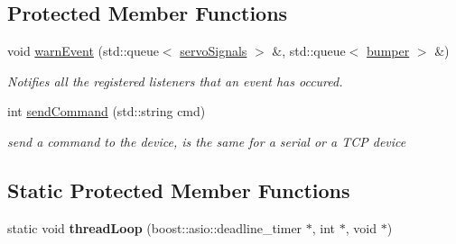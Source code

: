 \subsection*{Protected Member Functions}
\begin{DoxyCompactItemize}
\item 
\hypertarget{class_robot_a394e0a75b695970a8d67edb86d9c6b57}{}void \hyperlink{class_robot_a394e0a75b695970a8d67edb86d9c6b57}{warn\+Event} (std\+::queue$<$ \hyperlink{structservo_signals}{servo\+Signals} $>$ \&, std\+::queue$<$ \hyperlink{structbumper}{bumper} $>$ \&)\label{class_robot_a394e0a75b695970a8d67edb86d9c6b57}

\begin{DoxyCompactList}\small\item\em Notifies all the registered listeners that an event has occured. \end{DoxyCompactList}\item 
\hypertarget{class_robot_a55d36d87b7b3826fc5f495359c5472fd}{}int \hyperlink{class_robot_a55d36d87b7b3826fc5f495359c5472fd}{send\+Command} (std\+::string cmd)\label{class_robot_a55d36d87b7b3826fc5f495359c5472fd}

\begin{DoxyCompactList}\small\item\em send a command to the device, is the same for a serial or a T\+C\+P device \end{DoxyCompactList}\end{DoxyCompactItemize}
\subsection*{Static Protected Member Functions}
\begin{DoxyCompactItemize}
\item 
\hypertarget{class_robot_af159507f5d8069107a54fd31965cb65d}{}static void {\bfseries thread\+Loop} (boost\+::asio\+::deadline\+\_\+timer $\ast$, int $\ast$, void $\ast$)\label{class_robot_af159507f5d8069107a54fd31965cb65d}

\end{DoxyCompactItemize}
